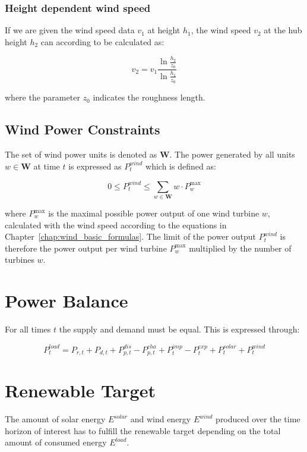 \subsubsection{Height dependent wind speed}
If we are given the wind speed data $v_1$ at height $h_1$, the wind speed  $v_2$ at the hub height $h_2$ can according to \cite{windspeed} be calculated as:

\setlength{\belowdisplayskip}{12pt} 
\setlength{\abovedisplayskip}{12pt} 

\begin{equation}\label{eq:windspeed at height}
    v_2 = v_1 \frac{\ln{\frac{h_2}{z_0}}}{\ln{\frac{h_1}{z_0}}}
\end{equation}

\noindent where the parameter $z_0$ indicates the roughness length. 

\subsection{Wind Power Constraints}
The set of wind power units is denoted as $\textbf{W}$. The power generated by all units $w \in \textbf{W}$ at time $t$ is expressed as $P^{wind}_{t}$ which is defined as:  

\begin{equation}\label{const:wind}
    0 \leq P^{wind}_{t} \leq \sum_{w \in \textbf{W}} w \cdot P^\text{max}_w
\end{equation}

\noindent where $P^\text{max}_w$ is the maximal possible power output of one wind turbine $w$, calculated with the wind speed according to the equations in Chapter~\ref{chap:wind_basic_formulas}. The limit of the power output $P^{wind}_{t}$ is therefore the power output per wind turbine $P^\text{max}_w$ multiplied by the number of turbines $w$.

\section{Power Balance}
For all times $t$ the supply and demand must be equal. This is expressed through: 

\begin{equation}\label{const:power balance}
    P^{load}_{t} = P_{r, t} + P_{d, t} + P^{dis}_{p,t} - P^{cha}_{p,t} + P^{imp}_{t} - P^{exp}_{t} + P^{solar}_{t} + P^{wind}_{t}
\end{equation}

\section{Renewable Target}
The amount of solar energy $E^{solar}$ and wind energy $E^{wind}$ produced over the time horizon of interest has to fulfill the renewable target depending on the total amount of consumed energy $E^{load}$. 

